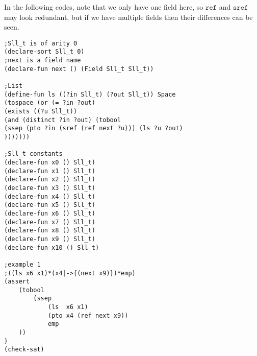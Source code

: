 \documentclass{article}
\theoremstyle{plain}
\begin{document}
In the following codes, %
note that we only have one field here, so $\mathtt{ref}$ and $\mathtt{sref}$ may look redundant, but if we have multiple fields then their differences can be seen.
\begin{verbatim}
;Sll_t is of arity 0
(declare-sort Sll_t 0)
;next is a field name
(declare-fun next () (Field Sll_t Sll_t))

;List
(define-fun ls ((?in Sll_t) (?out Sll_t)) Space
(tospace (or (= ?in ?out)
(exists ((?u Sll_t))
(and (distinct ?in ?out) (tobool
(ssep (pto ?in (sref (ref next ?u))) (ls ?u ?out)
)))))))

;Sll_t constants
(declare-fun x0 () Sll_t)
(declare-fun x1 () Sll_t)
(declare-fun x2 () Sll_t)
(declare-fun x3 () Sll_t)
(declare-fun x4 () Sll_t)
(declare-fun x5 () Sll_t)
(declare-fun x6 () Sll_t)
(declare-fun x7 () Sll_t)
(declare-fun x8 () Sll_t)
(declare-fun x9 () Sll_t)
(declare-fun x10 () Sll_t)

;example 1
;((ls x6 x1)*(x4|->{(next x9)})*emp)
(assert
    (tobool 
	    (ssep
       		(ls  x6 x1) 
       		(pto x4 (ref next x9))
       		emp
	))
)
(check-sat)

\end{verbatim}
\end{document}
